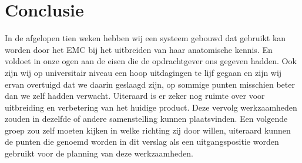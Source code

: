 \section{Conclusie}
\label{Conclusie}
In de afgelopen tien weken hebben wij een systeem gebouwd dat gebruikt kan worden door het EMC bij het uitbreiden van haar anatomische kennis. En voldoet in onze ogen aan de eisen die de opdrachtgever ons gegeven hadden. Ook zijn wij op universitair niveau een hoop uitdagingen te lijf gegaan en zijn wij ervan overtuigd dat we daarin geslaagd zijn, op sommige punten misschien beter dan we zelf hadden verwacht. 
Uiteraard is er zeker nog ruimte over voor uitbreiding en verbetering van het huidige product. Deze vervolg werkzaamheden zouden in dezelfde of andere samenstelling kunnen plaatsvinden. Een volgende groep zou zelf moeten kijken in welke richting zij door willen, uiteraard kunnen de punten die genoemd worden in dit verslag als een uitgangspositie worden gebruikt voor de planning van deze werkzaamheden. 
